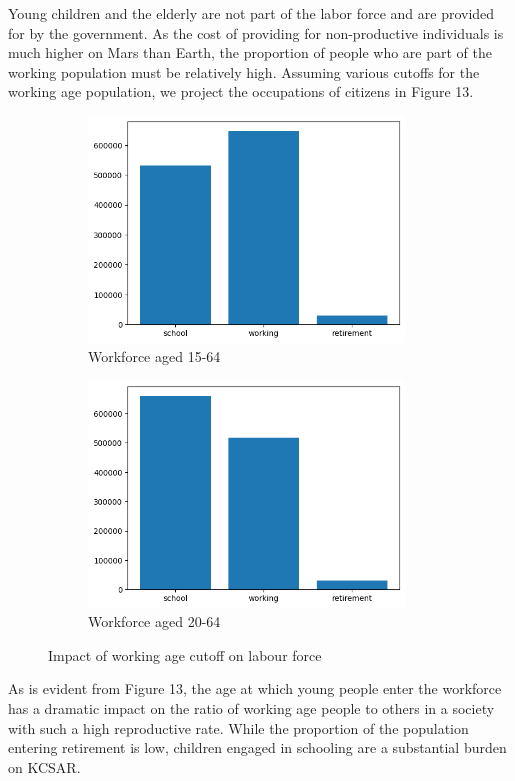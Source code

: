 \documentclass[fleqn,10pt]{Stylesheet} %
\begin{document}
Young children and the elderly are not part of the labor force and are provided for by the government. As the cost of providing for non-productive individuals is much higher on Mars than Earth, the proportion of people who are part of the working population must be relatively high. Assuming various cutoffs for the working age population, we project the occupations of citizens in Figure 13.

\begin{figure}[t!]
    \begin{subfigure}[t]{0.45\textwidth}
        \centering
        \includegraphics[height=60mm]{fig_demo_down.png}
        \caption{Workforce aged 15-64}
    \end{subfigure}
    \qquad \qquad  %
    \begin{subfigure}[t]{0.45\textwidth}
        \centering
        \includegraphics[height=60mm]{fig_demo.png}
        \caption{Workforce aged 20-64}
    \end{subfigure}
\caption{Impact of working age cutoff on labour force}\label{fig:animals}
\end{figure}

As is evident from Figure 13, the age at which young people enter the workforce has a dramatic impact on the ratio of working age people to others in a society with such a high reproductive rate. While the proportion of the population entering retirement is low, children engaged in schooling are a substantial burden on KCSAR. 
\end{document}
